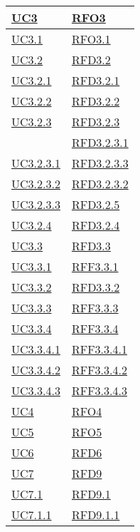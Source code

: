 \begin{longtable}{|>{\centering}m{5cm}|m{5cm}<{\centering}|}
\hyperref[UC3]{UC3} & \hyperlink{RFO3}{RFO3}\\ \hline
\hyperref[UC3.1]{UC3.1} & \hyperlink{RFO3.1}{RFO3.1}\\ \hline
\hyperref[UC3.2]{UC3.2} & \hyperlink{RFD3.2}{RFD3.2}\\ \hline
\hyperref[UC3.2.1]{UC3.2.1} & \hyperlink{RFD3.2.1}{RFD3.2.1}\\ \hline
\hyperref[UC3.2.2]{UC3.2.2} & \hyperlink{RFD3.2.2}{RFD3.2.2}\\ \hline
\hyperref[UC3.2.3]{UC3.2.3} & \hyperlink{RFD3.2.3}{RFD3.2.3}\\
& \hyperlink{RFD3.2.3.1}{RFD3.2.3.1}\\ \hline
\hyperref[UC3.2.3.1]{UC3.2.3.1} & \hyperlink{RFD3.2.3.3}{RFD3.2.3.3}\\ \hline
\hyperref[UC3.2.3.2]{UC3.2.3.2} & \hyperlink{RFD3.2.3.2}{RFD3.2.3.2}\\ \hline
\hyperref[UC3.2.3.3]{UC3.2.3.3} & \hyperlink{RFD3.2.5}{RFD3.2.5}\\ \hline
\hyperref[UC3.2.4]{UC3.2.4} & \hyperlink{RFD3.2.4}{RFD3.2.4}\\ \hline
\hyperref[UC3.3]{UC3.3} & \hyperlink{RFD3.3}{RFD3.3}\\ \hline
\hyperref[UC3.3.1]{UC3.3.1} & \hyperlink{RFF3.3.1}{RFF3.3.1}\\ \hline
\hyperref[UC3.3.2]{UC3.3.2} & \hyperlink{RFD3.3.2}{RFD3.3.2}\\ \hline
\hyperref[UC3.3.3]{UC3.3.3} & \hyperlink{RFF3.3.3}{RFF3.3.3}\\ \hline
\hyperref[UC3.3.4]{UC3.3.4} & \hyperlink{RFF3.3.4}{RFF3.3.4}\\ \hline
\hyperref[UC3.3.4.1]{UC3.3.4.1} & \hyperlink{RFF3.3.4.1}{RFF3.3.4.1}\\ \hline
\hyperref[UC3.3.4.2]{UC3.3.4.2} & \hyperlink{RFF3.3.4.2}{RFF3.3.4.2}\\ \hline
\hyperref[UC3.3.4.3]{UC3.3.4.3} & \hyperlink{RFF3.3.4.3}{RFF3.3.4.3}\\ \hline
\hyperref[UC4]{UC4} & \hyperlink{RFO4}{RFO4}\\ \hline
\hyperref[UC5]{UC5} & \hyperlink{RFO5}{RFO5}\\ \hline
\hyperref[UC6]{UC6} & \hyperlink{RFD6}{RFD6}\\ \hline
\hyperref[UC7]{UC7} & \hyperlink{RFD9}{RFD9}\\ \hline
\hyperref[UC7.1]{UC7.1} & \hyperlink{RFD9.1}{RFD9.1}\\ \hline
\hyperref[UC7.1.1]{UC7.1.1} & \hyperlink{RFD9.1.1}{RFD9.1.1}\\ \hline

\end{longtable}
